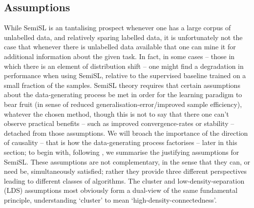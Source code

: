 \subsection{Assumptions}\label{ssec:assumptions}
While SemiSL is an tantalising prospect whenever one has a large corpus of unlabelled data, and
relatively sparing labelled data, it is unfortunately not the case that whenever there is
unlabelled data available that one can mine it for additional information about the given task. 
%
In fact, in some cases -- those in which there is an element of distribution shift -- one might
find a degradation in performance when using SemiSL, relative to the supervised baseline trained on
a small fraction of the samples.
%
SemiSL theory requires that certain assumptions about the data-generating process be met in order
for the learning paradigm to bear fruit (in sense of reduced generalisation-error/improved sample
efficiency), whatever the chosen method, though this is not to say that there one can't observe
practical benefits -- such as improved convergence-rates or stability -- detached from those
assumptions.
%
We will broach the importance of the direction of causality -- that is how the data-generating
process factorises -- later in this section; to begin with, following \citep{chapelle2009semi}, we
summarise the justifying assumptions for SemiSL.
%
These assumptions are not complementary, in the sense that they can, or need be, simultaneously
satisfied; rather they provide three different perspectives leading to different classes of
algorithms. 
%
The cluster and low-density-separation (LDS) assumptions most obviously form a dual-view of the same
fundamental principle, understanding `cluster' to mean `high-density-connectedness'.


